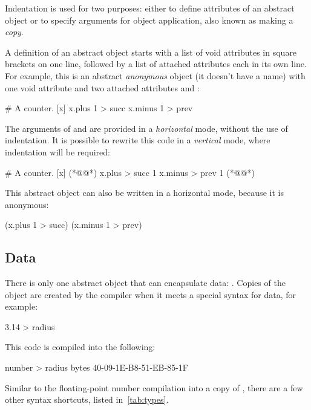 Indentation is used for two purposes: either to define attributes
of an abstract object or to specify arguments for object application, also
known as making a \emph{copy}.

A definition of an abstract object starts with a list of void attributes
in square brackets on one line, followed by a list of attached attributes
each in its own line. For example, this is an abstract \emph{anonymous} object
(it doesn't have a name)
with one void attribute  and two attached attributes  and :

\begin{ffcode}
# A counter.
[x]
  x.plus 1 > succ
  x.minus 1 > prev
\end{ffcode}

The arguments of  and  are provided in a \emph{horizontal}
mode, without the use of indentation. It is possible to rewrite this code
in a \emph{vertical} mode, where indentation will be required:

\begin{ffcode}
# A counter.
[x] (*@\label{ln:succ}@*)
  x.plus > succ
    1
  x.minus > prev
    1 (*@\label{ln:succ-end}@*)
\end{ffcode}

This abstract object can also be written in a horizontal mode,
because it is anonymous:

\begin{ffcode}
[x] (x.plus 1 > succ) (x.minus 1 > prev)
\end{ffcode}

\subsection{Data}

There is only one abstract object that can encapsulate data: .
Copies of the  object are created by the compiler when it meets
a special syntax for data, for example:

\begin{ffcode}
3.14 > radius
\end{ffcode}

This code is compiled into the following:

\begin{ffcode}
number > radius
  bytes
    40-09-1E-B8-51-EB-85-1F
\end{ffcode}

Similar to the floating-point number compilation into a copy
of , there are a few other syntax shortcuts, listed in~\cref{tab:types}.


